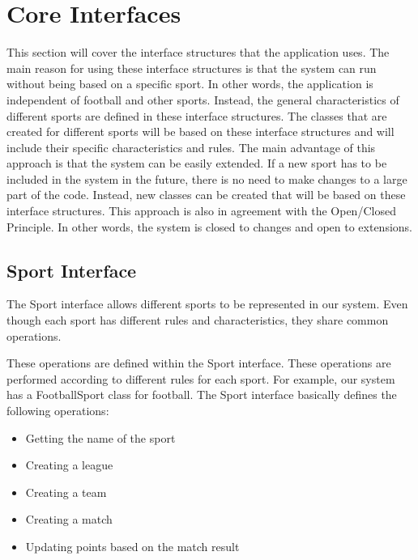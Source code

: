 \documentclass[12pt, a4paper]{article}
\begin{document}
\section{Core Interfaces}

This section will cover the interface structures that the application uses. The main reason for
using these interface structures is that the system can run without being based on a specific
sport. In other words, the application is independent of football and other sports. Instead, the
general characteristics of different sports are defined in these interface structures. The classes
that are created for different sports will be based on these interface structures and will include
their specific characteristics and rules. The main advantage of this approach is that the system
can be easily extended. If a new sport has to be included in the system in the future, there is
no need to make changes to a large part of the code. Instead, new classes can be created
that will be based on these interface structures. This approach is also in agreement with the
Open/Closed Principle. In other words, the system is closed to changes and open to
extensions.

\subsection{Sport Interface}

The Sport interface allows different sports to be represented in our system. Even though each
sport has different rules and characteristics, they share common operations.

These operations are defined within the Sport interface. These operations are performed
according to different rules for each sport. For example, our system has a FootballSport class
for football. The Sport interface basically defines the following operations:

\begin{itemize}
    \item Getting the name of the sport
    \item Creating a league
    \item Creating a team
    \item Creating a match
    \item Updating points based on the match result
\end{itemize}
\end{document}
